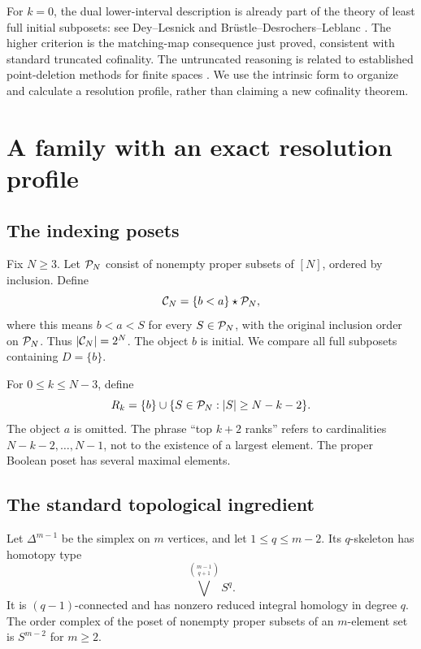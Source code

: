 For $k=0$, the dual lower-interval description is already part of the
theory of least full initial subposets: see Dey--Lesnick
\cite[Remark 3.6]{DeyLesnick} and Br\"ustle--Desrochers--Leblanc
\cite[Theorem C and Remark 2]{BrustleEtAl}. The higher criterion is the matching-map consequence just proved,
consistent with standard truncated cofinality. The untruncated
reasoning is related to established point-deletion methods for finite
spaces \cite{BarmakMinian}. We use the intrinsic form to organize and
calculate a resolution profile, rather than claiming a new cofinality
theorem.

\section{A family with an exact resolution profile}
\label{sec:family}

\subsection{The indexing posets}

Fix $N\geq3$. Let $\mathcal P_N$ consist of nonempty proper subsets of $[N]$,
ordered by inclusion. Define
\begin{equation}\label{eq:Cdef}
\mathcal C_N=\{b<a\}\star\mathcal P_N,
\end{equation}
where this means $b<a<S$ for every $S\in\mathcal P_N$, with the original
inclusion order on $\mathcal P_N$. Thus $|\mathcal C_N|=2^N$. The object $b$ is
initial. We compare all full subposets containing $D=\{b\}$.

For $0\leq k\leq N-3$, define
\begin{equation}\label{eq:Rdef}
R_k=\{b\}\cup\{S\in\mathcal P_N:|S|\geq N-k-2\}.
\end{equation}
The object $a$ is omitted. The phrase ``top $k+2$ ranks'' refers to
cardinalities $N-k-2,\ldots,N-1$, not to the existence of a largest
element. The proper Boolean poset has several maximal elements.

\subsection{The standard topological ingredient}

\begin{lemma}\label{lem:skeleton}
Let $\Delta^{m-1}$ be the simplex on $m$ vertices, and let
$1\leq q\leq m-2$. Its $q$-skeleton has homotopy type
\begin{equation}\label{eq:wedge}
\bigvee^{\binom{m-1}{q+1}}S^q.
\end{equation}
It is $(q-1)$-connected and has nonzero reduced integral homology in degree
$q$. The order complex of the poset of nonempty proper subsets of an
$m$-element set is $S^{m-2}$ for $m\geq2$.
\end{lemma}

